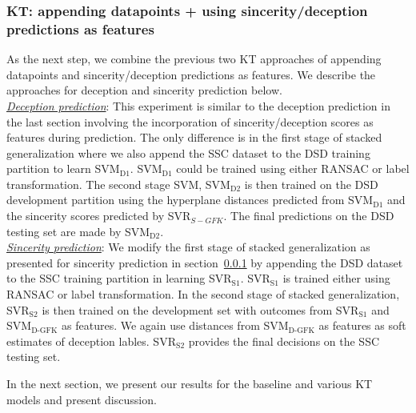 \documentclass{article}
\begin{document}
\subsubsection{KT: appending datapoints + using sincerity/deception predictions as features}
As the next step, we combine the previous two KT approaches of appending datapoints and sincerity/deception predictions as features.
We describe the approaches for deception and sincerity prediction below.
\\

\noindent\underline{\it Deception prediction}: 
This experiment is similar to the deception prediction in the last section involving the incorporation of sincerity/deception scores as features during prediction.
The only difference is in the first stage of stacked generalization where we also append the SSC dataset to the DSD training partition to learn SVM$_\text{D1}$. 
SVM$_\text{D1}$ could be trained using either RANSAC or label transformation.
The second stage SVM, SVM$_\text{D2}$ is then trained on the DSD development partition using the hyperplane distances predicted from SVM$_\text{D1}$ and the sincerity scores predicted by SVR$_{S-GFK}$. 
The final predictions on the DSD testing set are made by SVM$_\text{D2}$.
\\

\noindent\underline{\it Sincerity prediction}:
We modify the first stage of stacked generalization as presented for sincerity prediction in section~\ref{} by appending the DSD dataset to the SSC training partition in learning SVR$_\text{S1}$.
SVR$_\text{S1}$ is trained either using RANSAC or label transformation. 
In the second stage of stacked generalization, SVR$_\text{S2}$ is then trained on the development set with outcomes from SVR$_\text{S1}$ and SVM$_\text{D-GFK}$ as features.
We again use distances from SVM$_\text{D-GFK}$ as features as soft estimates of deception lables. 
SVR$_\text{S2}$ provides the final decisions on the SSC testing set.

In the next section, we present our results for the baseline and various KT models and present discussion.
\end{document}
